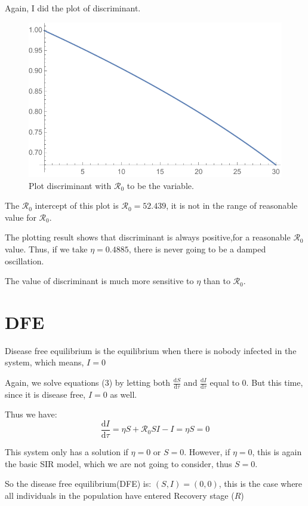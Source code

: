 \documentclass[12pt]{article}
\newcommand\dbyd[2]{\frac{\mathrm d{#1}}{\mathrm d{#2}}}
\newcommand{\R}{\mathcal{R}}
\begin{document}
Again, I did the plot of discriminant.

\begin{figure}[H]
  \caption{Plot discriminant with $\R_0$ to be the variable.}
  \includegraphics[width=1\textwidth]{Figures/Plot_R_S.pdf}
\end{figure}

The $\R_0$ intercept of this plot is $\R_0=52.439$, it is not in the range of reasonable value for $\R_0$.

The plotting result shows that discriminant is always positive,for a reasonable $\mathcal{R}_0$ value. Thus, if we take $\eta=0.4885$, there is never going to be a damped oscillation.

The value of discriminant is much more sensitive to $\eta$ than to $\mathcal{R}_0$.

\section{DFE}

Disease free equilibrium is the equilibrium when there is nobody infected in the system, which means, $I=0$

Again, we solve equations (3) by letting both $\dbyd{S}{\tau}$ and $\dbyd{I}{\tau}$ equal to 0. But this time, since it is disease free, $I=0$ as well.

Thus we have:
\begin{equation}
\dbyd{I}{\tau}=\eta S+\mathcal{R}_0 SI-I=\eta S=0
\end{equation}

This system only has a solution if $\eta=0$ or $S=0$. However, if $\eta=0$, this is again the basic SIR model, which we are not going to consider, thus $S=0$.

So the disease free equilibrium(DFE) is: $(S,I)=(0,0)$, this is the case where all individuals in the population have entered Recovery stage ($R$)
\end{document}

